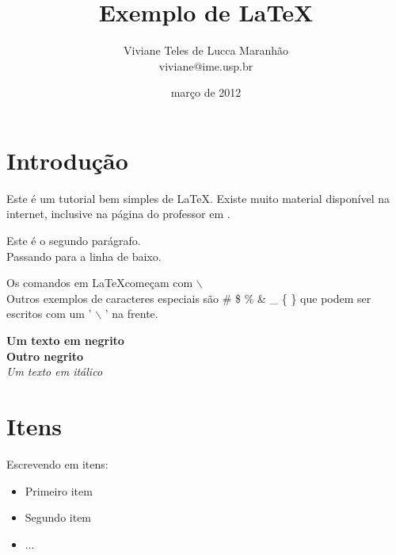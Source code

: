 \documentclass[12pt,a4paper]{report} %
\begin{document}
\title{Exemplo de \LaTeX} %
\author{Viviane Teles de Lucca Maranhão \\ viviane@ime.usp.br} %
\date{março de 2012} %

\maketitle %

\def \negritovi {\textbf} %

\tableofcontents %
\pagebreak %
\listoffigures %
\listoftables %
\pagebreak %

\section{Introdução} %
\mbox{} %


Este é um tutorial bem simples de \LaTeX. Existe muito material disponível na internet, inclusive na página do professor em \cite{stern}.

Este é o segundo parágrafo.
\\ Passando para a linha de baixo. %

Os comandos em \LaTeX começam com $\backslash$ %
\\Outros exemplos de caracteres especiais são \# \$ \%  \& \_ \{ \} que podem ser escritos com um ' $\backslash$ ' na frente.

\textbf{Um texto em negrito} %
\\ \negritovi{Outro negrito} %
\\ \textit{Um texto em itálico} %




\section{Itens}
\mbox{}


Escrevendo em itens:

\begin{itemize} %
\item Primeiro item %
\item Segundo item
\item ...
\end{itemize} %
\end{document}
